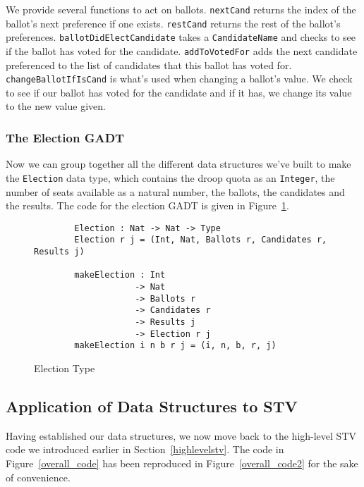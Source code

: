 We provide several functions to act on ballots. \texttt{nextCand} returns the
index of the ballot's next preference if one exists. \texttt{restCand} returns
the rest of the ballot's preferences. \texttt{ballotDidElectCandidate} takes a
\texttt{CandidateName} and checks to see if the ballot has voted for the
candidate. \texttt{addToVotedFor} adds the next candidate preferenced to the
list of candidates that this ballot has voted for. \texttt{changeBallotIfIsCand}
is what's used when changing a ballot's value. We check to see if our ballot has
voted for the candidate and if it has, we change its value to the new value
given. 

\subsubsection{The Election GADT}

Now we can group together all the different data structures we've built to make
the \texttt{Election} data type, which contains the droop quota as an
\texttt{Integer}, the number of seats available as a natural number, the
ballots, the candidates and the results. The code for the election GADT is given
in Figure~\ref{election_type_code}. 

\begin{figure}[ht!!!!!!!!!!!!!!]
	\caption{Election Type}
	\label{election_type_code}
	\begin{lstlisting}
        Election : Nat -> Nat -> Type
        Election r j = (Int, Nat, Ballots r, Candidates r, Results j)

        makeElection : Int 
                    -> Nat 
                    -> Ballots r
                    -> Candidates r 
                    -> Results j 
                    -> Election r j
        makeElection i n b r j = (i, n, b, r, j)
    \end{lstlisting}
\end{figure}

\newpage

\subsection{Application of Data Structures to STV}

Having established our data structures, we now move back to the high-level STV
code we introduced earlier in Section~\ref{highlevelstv}. The code in
Figure~\ref{overall_code} has been reproduced in Figure~\ref{overall_code2} for
the sake of convenience.

